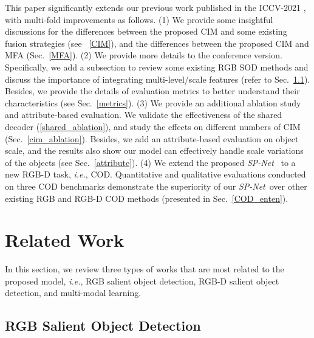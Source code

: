 \documentclass[10pt,twocolumn,letterpaper]{article}
\def\ie{\emph{i.e.}}
\def\ours{\emph{SP-Net}}
\begin{document}
This paper significantly extends our previous work published in the ICCV-2021 \cite{zhouiccv21}, with multi-fold improvements as follows. (1) We provide some insightful discussions for the differences between the proposed CIM and some existing fusion strategies (see ~\ref{CIM}), and the differences between the proposed CIM and MFA (Sec.~\ref{MFA}). (2) We provide more details to the conference version. Specifically, we add a subsection to review some existing RGB
SOD methods and discuss the importance of integrating multi-level/scale features (refer to Sec.~\ref{sod}). Besides, we provide the details of evaluation metrics to better understand their characteristics (see Sec.~\ref{metrics}).
(3) We provide an additional ablation study and attribute-based evaluation. We validate the effectiveness of the shared decoder (\ref{shared_ablation}), and study the effects on different numbers of CIM (Sec.~\ref{cim_ablation}). Besides, we add an attribute-based evaluation on object scale, and the results also show our model can effectively handle scale variations of the objects (see Sec.~\ref{attribute}).
(4) We extend the proposed \ours~ to a new RGB-D task, \ie, COD. Quantitative and qualitative evaluations conducted on three COD benchmarks demonstrate the superiority of our \ours~over other existing RGB and RGB-D COD methods (presented in Sec.~\ref{COD_enten}).



\section{Related Work}


In this section, we review three types of works that are most related to the proposed model, \ie, RGB salient object detection, RGB-D salient object detection, and multi-modal learning.

\subsection{RGB Salient Object Detection}
\label{sod}
\end{document}

